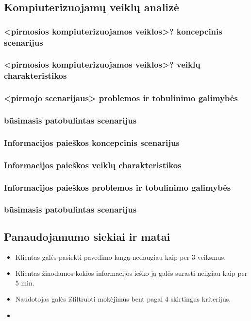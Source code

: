 \documentclass[oneside]{VUMIFPSkursinis}
\begin{document}
\subsection{Kompiuterizuojamų veiklų analizė}
\subsubsection{<pirmosios kompiuterizuojamos veiklos>? koncepcinis scenarijus}
\subsubsection{<pirmosios kompiuterizuojamos veiklos>? veiklų charakteristikos}
\subsubsection{<pirmojo scenarijaus> problemos ir tobulinimo galimybės}
\subsubsection{būsimasis patobulintas scenarijus}
\subsubsection{Informacijos paieškos koncepcinis scenarijus}
\subsubsection{Informacijos paieškos veiklų charakteristikos}
\subsubsection{Informacijos paieškos problemos ir tobulinimo galimybės}
\subsubsection{būsimasis patobulintas scenarijus}
\subsection{Panaudojamumo siekiai ir matai}
\begin{itemize}
	\item Klientas galės pasiekti pavedimo langą nedaugiau kaip per 3 veiksmus.
	\item Klientas žinodamos kokios informacijos ieško ją galės surasti neilgiau kaip per 5 min.
	\item Naudotojas galės išfiltruoti mokėjimus bent pagal 4 skirtingus kriterijus.
	\item 
\end{itemize}
\end{document}
